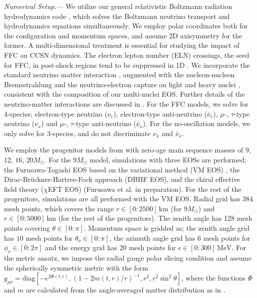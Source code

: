 \documentclass[
reprint,
superscriptaddress,
amsmath,amssymb,
aps,
prl
]{revtex4-2}
\begin{document}
{\em Numerical Setup.}---
We utilize our general relativistic Boltzmann radiation hydrodynamics code \cite{Nagakura2014ApJS..214...16N,Nagakura2017ApJS..229...42N,Nagakura2019ApJ...878..160N,Akaho2021ApJ...909..210A,Akaho2023ApJ...944...60A}, which solves the Boltzmann neutrino transport and hydrodynamics equations simultaneously.
We employ polar coordinates both for the configuration and momentum spaces, and assume 2D axisymmetry for the former.
A multi-dimensional treatment is essential for studying the impact of FFC on CCSN dynamics. The electron lepton number (ELN) crossings, the seed for FFC, in post-shock regions tend to be suppressed in 1D \cite{Nagakura2021PhRvD.104f3014N}.
We incorporate the standard neutrino matter interaction \cite{Bruenn1985ApJS...58..771B}, augmented with the nucleon-nucleon Bremsstrahlung and the neutrino-electron capture on light and heavy nuclei \citep{Langanke2000NuPhA.673..481L,Langanke2003PhRvL..90x1102L,Juodagalvis2010NuPhA.848..454J}, consistent with the composition of our multi-nuclei EOS.
Further details of the neutrino-matter interactions are discussed in \cite{Nagakura2019ApJS..240...38N}.
For the FFC models, we solve for 4-species; electron-type neutrino ($\nu_e$), electron-type anti-neutrino ($\bar\nu_e$), $\mu$-, $\tau$-type neutrino ($\nu_x$) and $\mu$-, $\tau$-type anti-neutrino ($\bar\nu_x$).
For the no-oscillation models, we only solve for 3-species, and do not discriminate $\nu_x$ and $\bar\nu_x$.

We employ the progenitor models from \cite{Sukhbold2016ApJ...821...38S} with zero-age main sequence masses of $9$, $12$, $16$, $20M_\odot$.
For the $9M_\odot$ model, simulations with three EOSs are performed; the Furusawa-Togashi EOS based on the variational method (VM EOS) \cite{Furusawa2017JPhG...44i4001F}, the Dirac-Br\"uckner-Hartree-Fock approach \cite{Furusawa2020PTEP.2020a3D05F} (DBHF EOS), and the chiral effective field theory ($\chi$EFT EOS) (Furusawa et al. in preparation).
For the rest of the progenitors, simulations are all performed with the VM EOS.
Radial grid has $384$ mesh points, which covers the range $r\in[0:2500]\,\mathrm{km}$ (for $9M_\odot$) and $r\in[0:5000]\,\mathrm{km}$ (for the rest of the progenitors). The zenith angle has 128 mesh points covering $\theta\in[0:\pi]$.
Momentum space is gridded as; the zenith angle grid has $10$ mesh points for $\theta_\nu\in[0:\pi]$, the azimuth angle grid has $6$ mesh points for $\phi_\nu\in[0:2\pi]$ and the energy grid has 20 mesh points for $\epsilon\in\left[0:300\right]\,\mathrm{MeV}$.
For the metric ansatz, we impose the radial gauge polar slicing condition and assume the spherically symmetric metric with the form
$g_{\mu\nu} = \mathrm{diag}\left[-e^{2\Phi(t,r)},\left(1-{2m(t,r)}/{r}\right)^{-1},r^2,r^2\sin^2\theta\right]$, where the functions $\Phi$ and $m$ are calculated from the angle-averaged matter distribution as in \cite{Akaho2025PhRvD.112d3015A}.
\end{document}
